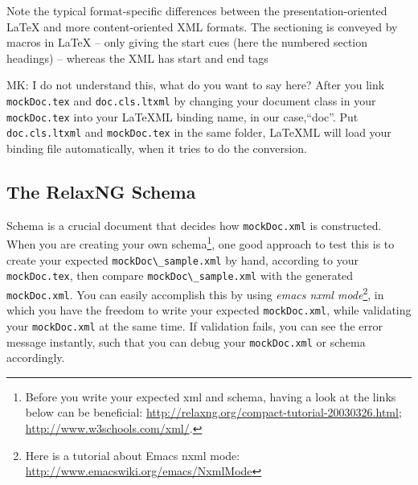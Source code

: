 \documentclass[a4paper]{article}
\def\latexml{{\LaTeX}ML\xspace}
\begin{document}
Note the typical format-specific differences between the presentation-oriented {\LaTeX}
and more content-oriented XML formats. The sectioning is conveyed by macros in {\LaTeX} --
only giving the start cues (here the numbered section headings) -- whereas the XML has
start and end tags

\begin{oldpart}{MK: I do not understand this, what do you want to say here?}
  After you link \lstinline|mockDoc.tex| and \lstinline|doc.cls.ltxml| by changing your
  document class in your \lstinline|mockDoc.tex| into your \latexml binding name, in our
  case,``doc''. Put \lstinline|doc.cls.ltxml| and \lstinline|mockDoc.tex| in the same
  folder, \latexml will load your binding file automatically, when it tries to do the
  conversion.
\end{oldpart}


\subsection{The RelaxNG Schema}\label{sec:rnc}
Schema is a crucial document that decides how \lstinline|mockDoc.xml| is constructed. When
you are creating your own schema\footnote{Before you write your expected xml and schema,
  having a look at the links below can be beneficial:
  \url{http://relaxng.org/compact-tutorial-20030326.html};
  \url{http://www.w3schools.com/xml/}. }, one good approach to test this is to create your
expected \lstinline|mockDoc\_sample.xml| by hand, according to your
\lstinline|mockDoc.tex|, then compare \lstinline|mockDoc\_sample.xml| with the generated
\lstinline|mockDoc.xml|. You can easily accomplish this by using \textit{emacs nxml
  mode}\footnote{Here is a tutorial about Emacs nxml mode:
  \url{http://www.emacswiki.org/emacs/NxmlMode}}, in which you have the freedom to write
your expected \lstinline|mockDoc.xml|, while validating your \lstinline|mockDoc.xml| at
the same time. If validation fails, you can see the error message instantly, such that you
can debug your \lstinline|mockDoc.xml| or schema accordingly.
\end{document}
